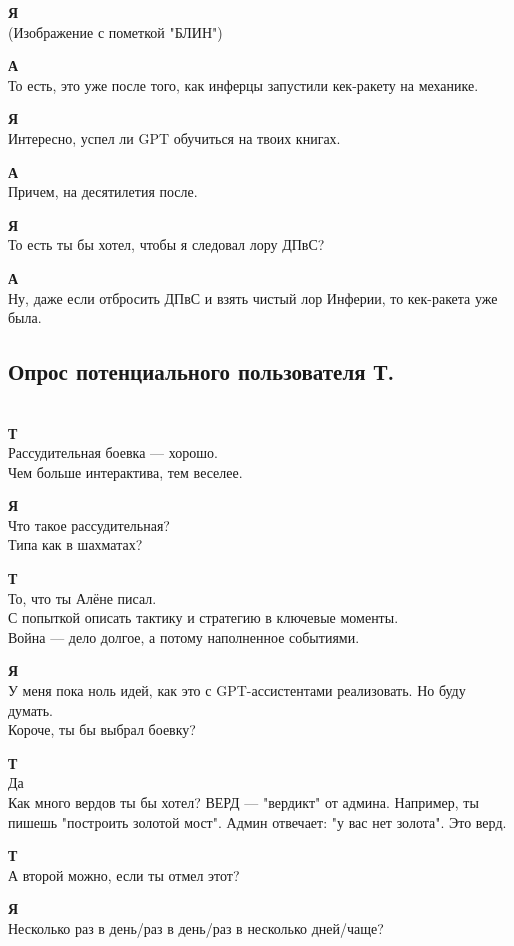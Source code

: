 \textbf{Я}\\
(Изображение с пометкой "БЛИН")

\textbf{А}\\
То есть, это уже после того, как инферцы запустили кек-ракету на механике.

\textbf{Я}\\
Интересно, успел ли GPT обучиться на твоих книгах.

\textbf{А}\\
Причем, на десятилетия после.

\textbf{Я}\\
То есть ты бы хотел, чтобы я следовал лору ДПвС?

\textbf{А}\\
Ну, даже если отбросить ДПвС и взять чистый лор Инферии, то кек-ракета уже была.

\subsection{Опрос потенциального пользователя Т.}\\
\textbf{Т}\\
Рассудительная боевка — хорошо.\\
Чем больше интерактива, тем веселее.

\textbf{Я}\\
Что такое рассудительная?\\
Типа как в шахматах?

\textbf{Т}\\
То, что ты Алёне писал.\\
С попыткой описать тактику и стратегию в ключевые моменты.\\
Война — дело долгое, а потому наполненное событиями.

\textbf{Я}\\
У меня пока ноль идей, как это с GPT-ассистентами реализовать. Но буду думать.\\
Короче, ты бы выбрал боевку?

\textbf{Т}\\
Да\\
Как много вердов ты бы хотел? ВЕРД — "вердикт" от админа. Например, ты пишешь "построить золотой мост". Админ отвечает: "у вас нет золота". Это верд.

\textbf{Т}\\
А второй можно, если ты отмел этот?

\textbf{Я}\\
Несколько раз в день/раз в день/раз в несколько дней/чаще?

